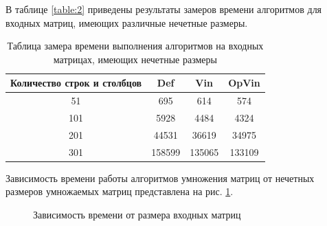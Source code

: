 \documentclass[12pt]{report}
\begin{document}
	
	В таблице \ref{table:2} приведены результаты замеров времени алгоритмов для входных матриц, имеющих различные нечетные размеры.
	
	\begin{table} [H]
		\caption{Таблица замера времени выполнения алгоритмов на входных матрицах, имеющих нечетные размеры}
		\label{table:t2}
		\begin{center}
			\begin{tabular}{|c | c | c | c |}
				
				\hline
				
				Количество строк и столбцов & Def & Vin & OpVin \\ [0.5ex]
				
				\hline
				
				51 & 695 & 614 & 574 \\ 
				
				\hline 
				
				101 & 5928 & 4484 & 4324\\ 
				
				\hline 
				
				201 & 44531 & 36619 & 34975\\ 
				
				\hline 
				
				301 & 158599 & 135065 & 133109\\ 
				
				\hline 
			\end{tabular}
		\end{center}
	\end{table}

	Зависимость времени работы алгоритмов умножения матриц от нечетных размеров умножаемых матриц представлена на рис. \ref{ris2}.

	\begin{center}
		\begin{figure}[H]
		\center
		\caption{Зависимость времени от размера входных матриц}
		\label{ris2}
		\end{figure}
	\end{center}
	
\end{document}
